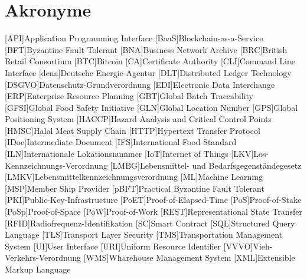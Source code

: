 \section*{Akronyme}            %
\begin{acronym}[HACCP]
  [API]{Application Programming Interface}
	[BaaS]{Blockchain-as-a-Service}
  [BFT]{Byzantine Fault Tolerant}
  [BNA]{Business Network Archive}
  [BRC]{British Retail Consortium}
	[BTC]{Bitcoin}
  [CA]{Certificate Authority}
  [CLI]{Command Line Interface}
	[dena]{Deutsche Energie-Agentur}
	[DLT]{Distributed Ledger Technology}
  [DSGVO]{Datenschutz-Grundverordnung}
  [EDI]{Electronic Data Interchange}
  [ERP]{Enterprise Resource Planning}
  [GBT]{Global Batch Traceability}
  [GFSI]{Global Food Safety Initiative}
  [GLN]{Global Location Number}
  [GPS]{Global Positioning System}
  [HACCP]{Hazard Analysis and Critical Control Points}
  [HMSC]{Halal Meat Supply Chain}
  [HTTP]{Hypertext Transfer Protocol}
  [IDoc]{Intermediate Document}
  [IFS]{International Food Standard}
  [ILN]{Internationale Lokationsnummer}
	[IoT]{Internet of Things}
  [LKV]{Los-Kennzeichnungs-Verordnung}
  [LMBG]{Lebensmittel- und Bedarfsgegenständegesetz}
  [LMKV]{Lebensmittelkennzeichnungsverordnung}
	[ML]{Machine Learning}
  [MSP]{Member Ship Provider}
  [pBFT]{Practical Byzantine Fault Tolerant}
  [PKI]{Public-Key-Infrastructure}
  [PoET]{Proof-of-Elapsed-Time}
  [PoS]{Proof-of-Stake}
  [PoSp]{Proof-of-Space}
	[PoW]{Proof-of-Work}
  [REST]{Representational State Transfer}
  [RFID]{Radiofrequenz-Identifikation}
	[SC]{Smart Contract}
  [SQL]{Structured Query Language}
  [TLS]{Transport Layer Security}
  [TMS]{Transportation Management System}
  [UI]{User Interface}
  [URI]{Uniform Resource Identifier}
  [VVVO]{Vieh-Verkehrs-Verordnung}
  [WMS]{Wharehouse Management System}
  [XML]{Extensible Markup Language}
\end{acronym}

\newpage

\listoffigures
{}
\listoftables
{}
\lstlistoflistings
{}
\newpage
